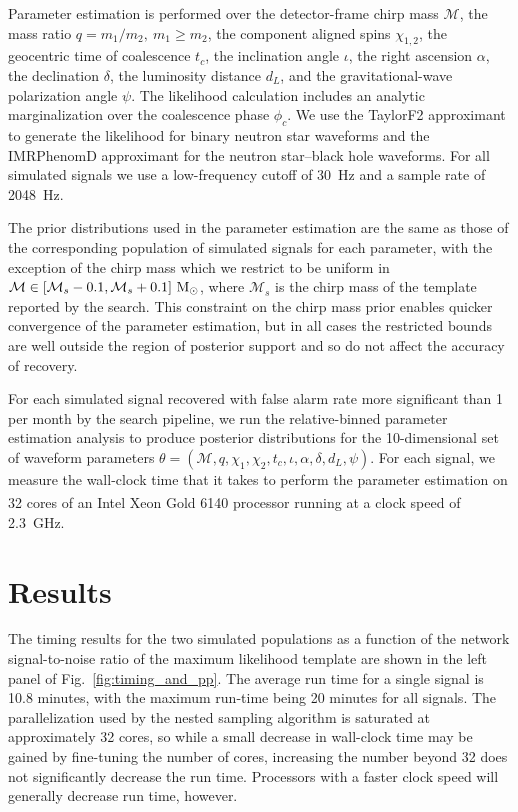 Parameter estimation is performed over the detector-frame chirp mass $\mathcal{M}$, the mass ratio $q=m_{1}/m_{2},~m_{1}\ge m_{2}$, the component aligned spins $\chi_{1,2}$, the geocentric time of coalescence $t_{c}$, the inclination angle $\iota$, the right ascension $\alpha$, the declination $\delta$, the luminosity distance $d_{L}$, and the gravitational-wave polarization angle $\psi$. The likelihood calculation includes an analytic marginalization over the coalescence phase $\phi_{c}$. We use the TaylorF2 approximant to generate the likelihood for binary neutron star waveforms and the IMRPhenomD approximant for the neutron star--black hole waveforms. For all simulated signals we use a low-frequency cutoff of 30~Hz and a sample rate of 2048~Hz.

The prior distributions used in the parameter estimation are the same as those of the corresponding population of simulated signals for each parameter, with the exception of the chirp mass which we restrict to be uniform in $\mathcal{M} \in [\mathcal{M}_{s}-0.1, \mathcal{M}_{s}+0.1]~\mathrm{M}_{\odot}$, where $\mathcal{M}_{s}$ is the chirp mass of the template reported by the search. This constraint on the chirp mass prior enables quicker convergence of the parameter estimation, but in all cases the restricted bounds are well outside the region of posterior support and so do not affect the accuracy of recovery.

For each simulated signal recovered with false alarm rate more significant than 1 per month by the search pipeline, we run the relative-binned parameter estimation analysis
to produce posterior distributions for the 10-dimensional set of waveform parameters $\theta = (\mathcal{M}, q, \chi_{1}, \chi_{2}, t_{c}, \iota, \alpha, \delta, d_{L}, \psi)$. For each signal, we measure the wall-clock time that it takes to perform the parameter estimation on 32 cores of an Intel\textsuperscript{\textregistered} Xeon\textsuperscript{\textregistered} Gold 6140 processor running at a clock speed of 2.3~GHz. 

\section{Results} \label{sec:rel_bin_results}

The timing results for the two simulated populations as a function of the network signal-to-noise ratio of the maximum likelihood template are shown in the left panel of Fig.~\ref{fig:timing_and_pp}. The average run time for a single signal is 10.8 minutes, with the maximum run-time being 20 minutes for all signals. The parallelization used by the nested sampling algorithm is saturated at approximately 32 cores, so while a small decrease in wall-clock time may be gained by fine-tuning the number of cores, increasing the number beyond 32 does not significantly decrease the run time. Processors with a faster clock speed will generally decrease run time, however.

